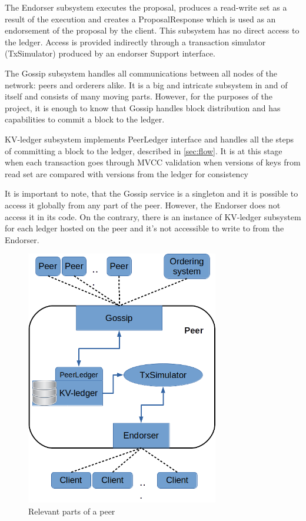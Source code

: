 The Endorser subsystem executes the proposal, produces a read-write set as a result of the execution and creates a ProposalResponse which is used as an endorsement of the proposal by the client.  This subsystem has no direct access to the ledger. Access is provided indirectly through a transaction simulator (TxSimulator) produced by an endorser Support interface.

The Gossip subsystem handles all communications between all nodes of the network: peers and orderers alike. It is a big and intricate subsystem in and of itself and consists of many moving parts. However, for the purposes of the project, it is enough to know that Gossip handles block distribution and has capabilities to commit a block to the ledger.

KV-ledger subsystem implements PeerLedger interface and handles all the steps of committing a block to the ledger, described in \ref{sec:flow}. It is at this stage when each transaction goes through MVCC validation when versions of keys from read set are compared with versions from the ledger for consistency

It is important to note, that the Gossip service is a singleton and it is possible to access it globally from any part of the peer. However, the Endorser does not access it in its code. On the contrary, there is an instance of KV-ledger subsystem for each ledger hosted on the peer and it's not accessible to write to from the Endorser.

\vspace{0.5cm}
\begin{figure}[H]
\begin{center}
\includegraphics[width=0.75\textwidth]{figures/peer}
\end{center}
\caption{Relevant parts of a peer}
\label{fig:peer}
\end{figure}
